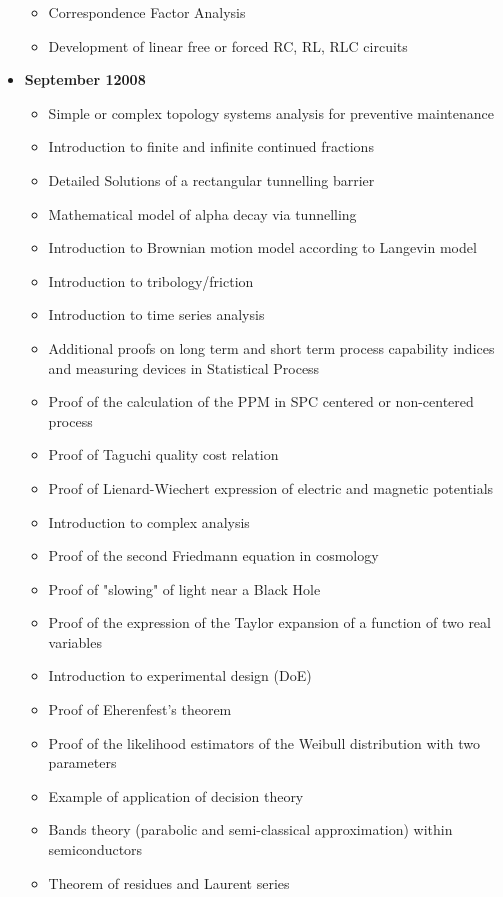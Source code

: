 \begin{itemize}
\begin{itemize}[noitemsep]
			\item Correspondence Factor Analysis
			\item Development of linear free or forced RC, RL, RLC circuits
		\end{itemize}
	\item \textbf{September 12008}
		\begin{itemize}[noitemsep]
			\item Simple or complex topology systems analysis for preventive maintenance
			\item Introduction to finite and infinite continued fractions
			\item Detailed Solutions of a rectangular tunnelling barrier
			\item Mathematical model of alpha decay via tunnelling
			\item Introduction to Brownian motion model according to Langevin model
			\item Introduction to tribology/friction
			\item Introduction to time series analysis
			\item Additional proofs on long term and short term process capability indices and measuring devices in Statistical Process
			\item Proof of the calculation of the PPM in SPC centered or non-centered process
			\item Proof of Taguchi quality cost relation
			\item Proof of Lienard-Wiechert expression of electric and magnetic potentials 
			\item Introduction to complex analysis
			\item Proof of the second Friedmann equation in cosmology
			\item Proof of "slowing" of light near a Black Hole
			\item Proof of the expression of the Taylor expansion of a function of two real variables
			\item Introduction to experimental design (DoE)
			\item Proof of Eherenfest's theorem
			\item Proof of the likelihood estimators of the Weibull distribution with two parameters
			\item Example of application of decision theory
			\item Bands theory (parabolic and semi-classical approximation) within semiconductors
			\item Theorem of residues and Laurent series

\end{itemize}
\end{itemize}
